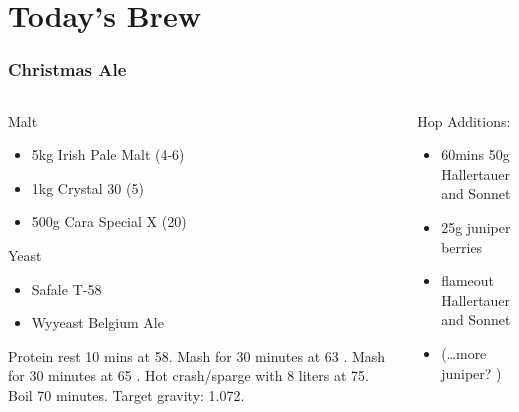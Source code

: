 \documentclass{beamer}
\begin{document}
\section{Today's Brew}

\begin{frame}\frametitle{Christmas Ale}
  \begin{columns}
    \begin{column}{.5\textwidth}
      Malt
      \begin{itemize}
      \item 5kg Irish Pale Malt (4-6)
      \item 1kg Crystal 30  (5)
      \item 500g Cara Special X  (20)
      \end{itemize}
      Yeast
      \begin{itemize}
      \item Safale T-58
      \item Wyyeast Belgium Ale
      \end{itemize}
      Protein rest 10 mins at 58\degree.
      Mash for 30 minutes at 63 \degree.
      Mash for 30 minutes at 65 \degree.
      Hot crash/sparge with 8 liters at 75\degree.
      Boil 70 minutes.  Target gravity: 1.072.
    \end{column}
    \begin{column}{.5\textwidth}
      Hop Additions:
    \begin{itemize}
    \item 60mins 50g Hallertauer and Sonnet
    \item 25g juniper berries
    \item flameout Hallertauer and Sonnet
    \item (\dots more juniper? )
    \end{itemize}
  \end{column}
\end{columns}
\end{frame}



\end{document}

